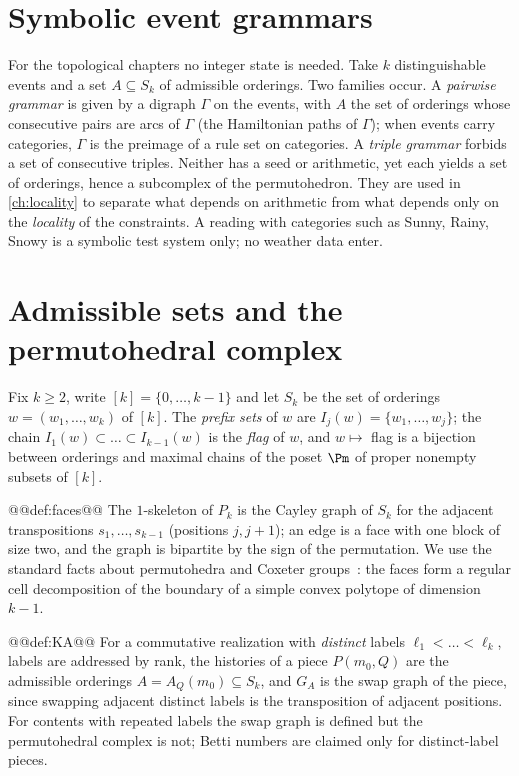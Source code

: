 \section{Symbolic event grammars}\label{sec:symbolic}
For the topological chapters no integer state is needed. Take $k$ distinguishable events and a set $A\subseteq S_k$ of admissible orderings. Two families occur. A \emph{pairwise grammar} is given by a digraph $\Gamma$ on the events, with $A$ the set of orderings whose consecutive pairs are arcs of $\Gamma$ (the Hamiltonian paths of $\Gamma$); when events carry categories, $\Gamma$ is the preimage of a rule set on categories. A \emph{triple grammar} forbids a set of consecutive triples. Neither has a seed or arithmetic, yet each yields a set of orderings, hence a subcomplex of the permutohedron. They are used in \cref{ch:locality} to separate what depends on arithmetic from what depends only on the \emph{locality} of the constraints. A reading with categories such as Sunny, Rainy, Snowy is a symbolic test system only; no weather data enter.

\section{Admissible sets and the permutohedral complex}\label{sec:complex}
Fix $k\ge2$, write $[k]=\{0,\dots,k-1\}$ and let $S_k$ be the set of orderings $w=(w_1,\dots,w_k)$ of $[k]$. The \emph{prefix sets} of $w$ are $I_j(w)=\{w_1,\dots,w_j\}$; the chain $I_1(w)\subset\dots\subset I_{k-1}(w)$ is the \emph{flag} of $w$, and $w\mapsto$ flag is a bijection between orderings and maximal chains of the poset $\Pm$ of proper nonempty subsets of $[k]$.

@@def:faces@@
The $1$-skeleton of $P_k$ is the Cayley graph of $S_k$ for the adjacent transpositions $s_1,\dots,s_{k-1}$ (positions $j,j{+}1$); an edge is a face with one block of size two, and the graph is bipartite by the sign of the permutation. We use the standard facts about permutohedra and Coxeter groups~\cite{Ziegler,BjornerBrenti}: the faces form a regular cell decomposition of the boundary of a simple convex polytope of dimension $k-1$.

@@def:KA@@
For a commutative realization with \emph{distinct} labels $\ell_1<\dots<\ell_k$, labels are addressed by rank, the histories of a piece $P(m_0,Q)$ are the admissible orderings $A=A_Q(m_0)\subseteq S_k$, and $G_A$ is the swap graph of the piece, since swapping adjacent distinct labels is the transposition of adjacent positions. For contents with repeated labels the swap graph is defined but the permutohedral complex is not; Betti numbers are claimed only for distinct-label pieces.

